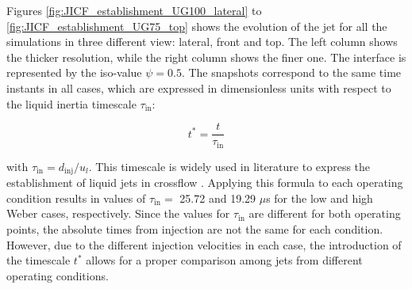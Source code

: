 
Figures \ref{fig:JICF_establishment_UG100_lateral} to \ref{fig:JICF_establishment_UG75_top} shows the evolution of the jet for all the simulations in three different view: lateral, front and top. The left column shows the thicker resolution, while the right column shows the finer one. The interface is represented by the iso-value $\psi = 0.5$. The snapshots correspond to the same time instants in all cases, which are expressed in dimensionless units with respect to the liquid inertia timescale $\tau_\mathrm{in}$:

\begin{equation}
\label{eq:t_dimensionless_with_tau_in}
t^* = \frac{t}{\tau_\mathrm{in}}
\end{equation}

with $\tau_\mathrm{in} = d_\mathrm{inj}/u_l$. This timescale is widely used in literature to express the establishment of liquid jets in crossflow . Applying this formula to each operating condition results in values of $\tau_\mathrm{in} = $ 25.72 and 19.29 $\mu$s for the low and high Weber cases, respectively. Since the values for $\tau_\mathrm{in}$ are different for both operating points, the absolute times from injection are not the same for each condition. However, due to the different injection velocities in each case, the introduction of the timescale $t^*$ allows for a proper comparison among jets from different operating conditions.


